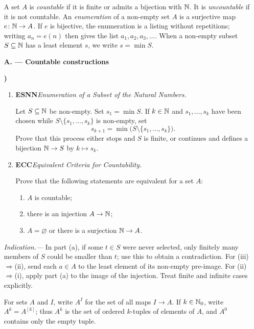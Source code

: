 \documentclass[10pt,a4paper]{article}
\newcounter{examquestion}
\newcommand{\examquestion}[1]{%
  \Needspace{5\baselineskip}%
  \refstepcounter{examquestion}%
  \par\addvspace{0.8\baselineskip}%
  \noindent\textbf{\theexamquestion)}\enspace #1\par
}
\newenvironment{subquestions}
  {\begin{enumerate}[label=\alph*),leftmargin=2.1em]}
  {\end{enumerate}}
\newcommand{\nameditem}[2]{%
  \textbf{\textsf{#1}}\enspace\emph{#2.}\enspace
}
\newenvironment{properties}
  {\begin{enumerate}[label=(\roman*),leftmargin=2.4em]}
  {\end{enumerate}}
\newcommand{\indication}[1]{%
  \par\smallskip\noindent\emph{Indication.---} #1\par
}
\newcommand{\subpart}[1]{%
  \begin{center}
    \textbf{#1}
  \end{center}
}
\begin{document}
A set $A$ is \emph{countable} if it is finite or admits a bijection with
$\mathbb{N}$.  It is \emph{uncountable} if it is not countable.  An
\emph{enumeration} of a non-empty set $A$ is a surjective map
$e\colon\mathbb{N}\to A$.  If $e$ is bijective, the enumeration is a listing
without repetitions; writing $a_n=e(n)$ then gives the list
$a_1,a_2,a_3,\ldots$.
When a non-empty subset $S\subseteq\mathbb{N}$ has a least element $s$, we write
$s=\min S$.

\subpart{A. --- Countable constructions}

\examquestion{\label{q:countability-criteria}
\begin{subquestions}
  \item \nameditem{ESNN}{Enumeration of a Subset of the Natural Numbers}
  Let $S\subseteq\mathbb{N}$ be non-empty.  Set $s_1=\min S$.  If
  $k\in\mathbb{N}$ and $s_1,\ldots,s_k$ have been chosen while
  $S\setminus\{s_1,\ldots,s_k\}$ is non-empty, set
  \[
    s_{k+1}=\min\bigl(S\setminus\{s_1,\ldots,s_k\}\bigr).
  \]
  Prove that this process either stops and $S$ is finite, or continues and
  defines a bijection $\mathbb{N}\to S$ by $k\mapsto s_k$.
  \item \nameditem{ECC}{Equivalent Criteria for Countability}
  Prove that the following statements are equivalent for a set $A$:
  \begin{properties}
    \item $A$ is countable;
    \item there is an injection $A\to\mathbb{N}$;
    \item $A=\varnothing$ or there is a surjection $\mathbb{N}\to A$.
  \end{properties}
\end{subquestions}
\indication{In part (a), if some $t\in S$ were never selected, only
finitely many members of $S$ could be smaller than $t$; use this to obtain
a contradiction.  For (iii)$\Rightarrow$(ii), send each $a\in A$ to the least
element of its non-empty pre-image.  For (ii)$\Rightarrow$(i), apply part
(a) to the image of the injection.  Treat finite and infinite cases
explicitly.}}

For sets $A$ and $I$, write $A^I$ for the set of all maps $I\to A$.  If
$k\in\mathbb{N}_0$, write $A^k=A^{[k]}$; thus $A^k$ is the set of ordered
$k$-tuples of elements of $A$, and $A^0$ contains only the empty tuple.
\end{document}
